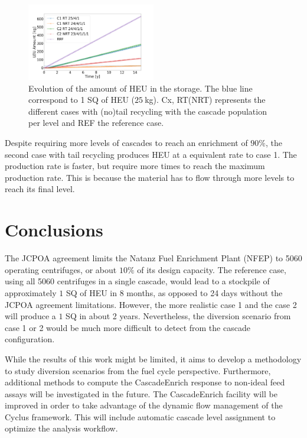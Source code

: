 \documentclass{anstrans}
\begin{document}
\begin{figure}[ht] %
  \centering
  \includegraphics[width=0.5\textwidth]{HEU_prod.png} \caption{Evolution of the
  amount of HEU in the storage. The blue line correspond to 1 SQ of HEU
  ($25~$kg). Cx, RT(NRT) represents the different cases with (no)tail recycling
  with the cascade population per level and REF the reference
  case.}\label{fig:heu_prod}
\end{figure}

Despite requiring more levels of cascades to
reach an enrichment of $90\%$, the second case with tail recycling produces HEU
at a equivalent rate to case 1. The production rate is faster, but
require more times to reach the maximum production rate. This is because the material has to
flow through more levels to reach its final level.


\section{Conclusions}

The JCPOA agreement limits the Natanz Fuel Enrichment Plant (NFEP) to 5060
operating centrifuges, or about $10\%$ of its design capacity. The reference
case, using all 5060 centrifuges in a single cascade, would lead to a stockpile
of approximately $1$ SQ of HEU in 8 months, as opposed to 24 days without the
JCPOA agreement limitations. However, the more realistic case 1 and the case 2
will produce a $1$ SQ in about 2 years. Nevertheless, the diversion scenario
from case 1 or 2 would be much more difficult to detect from the cascade
configuration.

While the results of this work might be limited, it aims to develop a
methodology to study diversion scenarios from the fuel cycle perspective.
Furthermore, additional methods to compute the CascadeEnrich response to
non-ideal feed assays will be investigated in the future.  The CascadeEnrich
facility will be improved in order to take advantage of the dynamic flow
management of the Cyclus framework. This will include automatic cascade level
assignment to optimize the analysis workflow.
\end{document}
